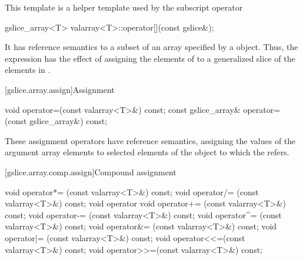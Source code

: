 \pnum
This template is a helper template used by the
subscript operator

%
%
\begin{itemdecl}
gslice_array<T> valarray<T>::operator[](const gslice&);
\end{itemdecl}

\pnum
It has reference semantics to a subset of an array specified by a
object.
Thus, the expression
has the effect of assigning the elements of
to a
generalized slice of the elements in
.

[gslice.array.assign]{Assignment}

%
\begin{itemdecl}
void operator=(const valarray<T>&) const;
const gslice_array& operator=(const gslice_array&) const;
\end{itemdecl}

\begin{itemdescr}
\pnum
These assignment operators have reference semantics, assigning the values
of the argument array elements to selected elements of the
object to which the
refers.
\end{itemdescr}

[gslice.array.comp.assign]{Compound assignment}

%
%
%
%
%
%
%
%
%
%
\begin{itemdecl}
void operator*= (const valarray<T>&) const;
void operator/= (const valarray<T>&) const;
void operator%
void operator+= (const valarray<T>&) const;
void operator-= (const valarray<T>&) const;
void operator^= (const valarray<T>&) const;
void operator&= (const valarray<T>&) const;
void operator|= (const valarray<T>&) const;
void operator<<=(const valarray<T>&) const;
void operator>>=(const valarray<T>&) const;
\end{itemdecl}

